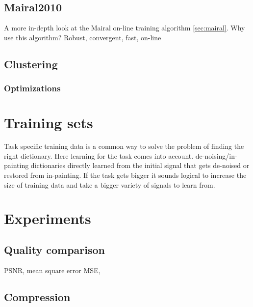 \subsection{Mairal2010}
A more in-depth look at the Mairal on-line training algorithm \ref{sec:mairal}. 
Why use this algorithm? Robust, convergent, fast, on-line


\subsection{Clustering}
\subsubsection*{Optimizations}



\section{Training sets}
Task specific training data is a common way to solve the problem of finding the right dictionary. 
Here learning for the task comes into account. de-noising/in-painting dictionaries directly learned from the initial
signal that gets de-noised or restored from in-painting.
If the task gets bigger it sounds logical to increase the size of training data and take a bigger variety of signals to learn from.



\section{Experiments}
\subsection{Quality comparison}
PSNR, mean square error MSE, 



\subsection{Compression}

